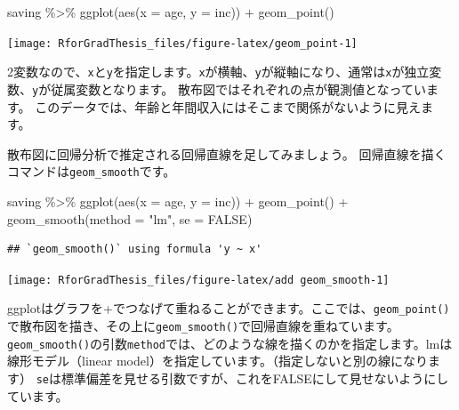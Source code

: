 \documentclass[
]{book}
\newenvironment{Shaded}{\begin{snugshade}}{\end{snugshade}}
\newcommand{\AttributeTok}[1]{\textcolor[rgb]{0.77,0.63,0.00}{#1}}
\newcommand{\ConstantTok}[1]{\textcolor[rgb]{0.00,0.00,0.00}{#1}}
\newcommand{\FunctionTok}[1]{\textcolor[rgb]{0.00,0.00,0.00}{#1}}
\newcommand{\NormalTok}[1]{#1}
\newcommand{\SpecialCharTok}[1]{\textcolor[rgb]{0.00,0.00,0.00}{#1}}
\newcommand{\StringTok}[1]{\textcolor[rgb]{0.31,0.60,0.02}{#1}}
\begin{document}
\begin{Shaded}
\begin{Highlighting}[]
\NormalTok{saving }\SpecialCharTok{\%\textgreater{}\%}
  \FunctionTok{ggplot}\NormalTok{(}\FunctionTok{aes}\NormalTok{(}\AttributeTok{x =}\NormalTok{ age, }\AttributeTok{y =}\NormalTok{ inc)) }\SpecialCharTok{+}
  \FunctionTok{geom\_point}\NormalTok{()}
\end{Highlighting}
\end{Shaded}

\begin{center}\texttt{[image: RforGradThesis\_files/figure-latex/geom\_point-1]} \end{center}

2変数なので、\texttt{x}と\texttt{y}を指定します。\texttt{x}が横軸、\texttt{y}が縦軸になり、通常は\texttt{x}が独立変数、\texttt{y}が従属変数となります。
散布図ではそれぞれの点が観測値となっています。
このデータでは、年齢と年間収入にはそこまで関係がないように見えます。

散布図に回帰分析で推定される回帰直線を足してみましょう。
回帰直線を描くコマンドは\texttt{geom\_smooth}です。

\begin{Shaded}
\begin{Highlighting}[]
\NormalTok{saving }\SpecialCharTok{\%\textgreater{}\%}
  \FunctionTok{ggplot}\NormalTok{(}\FunctionTok{aes}\NormalTok{(}\AttributeTok{x =}\NormalTok{ age, }\AttributeTok{y =}\NormalTok{ inc)) }\SpecialCharTok{+}
  \FunctionTok{geom\_point}\NormalTok{() }\SpecialCharTok{+}
  \FunctionTok{geom\_smooth}\NormalTok{(}\AttributeTok{method =} \StringTok{"lm"}\NormalTok{, }\AttributeTok{se =} \ConstantTok{FALSE}\NormalTok{)}
\end{Highlighting}
\end{Shaded}

\begin{verbatim}
## `geom_smooth()` using formula 'y ~ x'
\end{verbatim}

\begin{center}\texttt{[image: RforGradThesis\_files/figure-latex/add geom\_smooth-1]} \end{center}

ggplotはグラフを+でつなげて重ねることができます。ここでは、\texttt{geom\_point()}で散布図を描き、その上に\texttt{geom\_smooth()}で回帰直線を重ねています。
\texttt{geom\_smooth()}の引数\texttt{method}では、どのような線を描くのかを指定します。lmは線形モデル（linear model）を指定しています。（指定しないと別の線になります）
\texttt{se}は標準偏差を見せる引数ですが、これをFALSEにして見せないようにしています。
\end{document}
